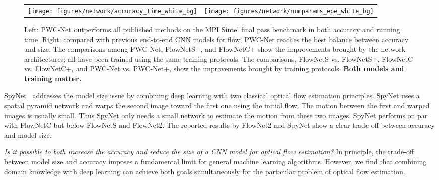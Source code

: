 \documentclass[10pt,journal,cspaper,compsoc]{IEEEtran}
\begin{document}
	\begin{figure*}[t]
		\begin{center}
			\newcommand{\figwidth}{0.035\linewidth}
			\newcommand{\Figwidth}{0.48\linewidth}
			\newcommand{\Figheight}{0.375\linewidth}
			\newcommand{\shiftfigure}{\hspace{-3.5mm}}
			\begin{tabular}{cc}
			\shiftfigure
			\texttt{[image: figures/network/accuracy\_time\_white\_bg]} &
			\shiftfigure \shiftfigure
			\texttt{[image: figures/network/numparams\_epe\_white\_bg]}	
			\end{tabular}
			\caption{ 
				Left: PWC-Net outperforms all published methods on the MPI Sintel final pass benchmark in both accuracy and running time. 
				Right:  compared with previous end-to-end CNN models for flow, PWC-Net reaches the best balance between accuracy and size. The comparisons among PWC-Net, FlowNetS+, and FlowNetC+  show the improvements brought by the network architectures; all have been trained using the same training protocols.
				The comparisons,  FlowNetS vs. FlowNetS+, FlowNetC vs. FlowNetC+, and PWC-Net vs. PWC-Net+, show the improvements brought by training protocols. 
				\textbf{Both models and training matter.}
			}		
			\label{fig:memory:aepe}
		\end{center}
	\end{figure*}
	
	SpyNet~\cite{Ranjan:2016:SpyNet} addresses the model size issue by combining deep learning with two classical optical flow estimation principles. SpyNet uses a spatial pyramid network and warps the second image toward the first one using the initial flow. The motion between the first and warped images is usually small. Thus SpyNet only needs a small network to estimate the motion from these two images. SpyNet performs on par with FlowNetC but below FlowNetS and FlowNet2. The reported results by FlowNet2 and SpyNet show a clear trade-off between accuracy and model size. 	
		
	\emph{Is it possible to both increase the accuracy and reduce the size  of a CNN model for optical flow estimation?} In principle, the trade-off between model size and accuracy imposes a fundamental limit for general machine learning algorithms. 
	However, we find that combining domain knowledge with deep learning can achieve both goals simultaneously for the particular problem of optical flow estimation.
	
\end{document}
